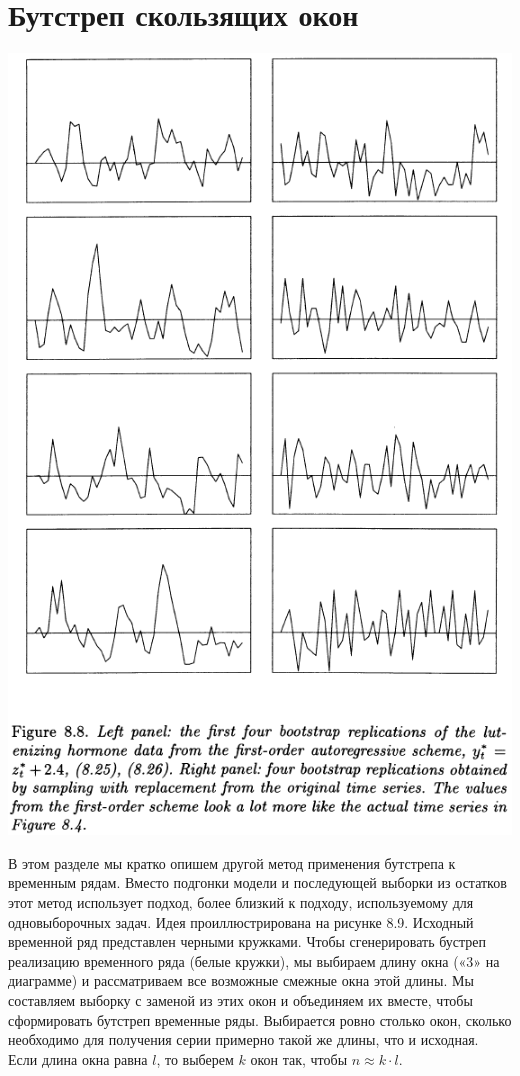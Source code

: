 \section{Бутстреп скользящих окон}

\noindent
\includegraphics[width=\linewidth]{8/f88}
\newline

\noindent В этом разделе мы кратко опишем другой метод применения бутстрепа к временным рядам. Вместо подгонки модели и последующей выборки из остатков этот метод использует подход, более близкий к подходу, используемому для одновыборочных задач. Идея проиллюстрирована на рисунке 8.9. Исходный временной ряд представлен черными кружками. Чтобы сгенерировать бустреп реализацию временного ряда (белые кружки), мы выбираем длину окна («$3$» на диаграмме) и рассматриваем все возможные смежные окна этой длины. Мы составляем выборку с заменой из этих окон и объединяем их вместе, чтобы сформировать бутстреп временные ряды. Выбирается ровно столько окон, сколько необходимо для получения серии примерно такой же длины, что и исходная. Если длина окна равна $l$, то выберем $k$ окон так, чтобы $n \approx k \cdot l$.

